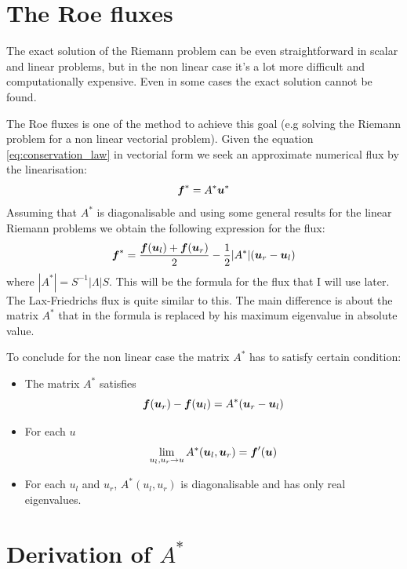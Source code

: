 \documentclass[oneside,12pt]{book}  %
\theoremstyle{plain}
\theoremstyle{definition}
\theoremstyle{remark}
\numberwithin{equation}{chapter} %
\begin{document}
\section{The Roe fluxes}
The exact solution of the Riemann problem can be even straightforward in
scalar and linear problems, but in the non linear case it's a lot more
difficult and computationally expensive. Even in some cases the exact
solution cannot be found.

The Roe fluxes is one of the method to achieve this goal (e.g solving
the Riemann problem for a non linear vectorial problem). 
Given the equation \ref{eq:conservation_law} in vectorial form we seek
an approximate numerical flux by the linearisation:
\begin{equation}
  \label{eq:linearization_roe}
  {\mbox{\boldmath$f$}}^*=A^*{\mbox{\boldmath$u$}}^*
\end{equation}
Assuming that $A^*$ is diagonalisable and using some general results
for the linear Riemann problems we obtain the following expression for
the flux:
\begin{equation}
  \label{eq:roe_flux}
  {\mbox{\boldmath$f$}}^*=\frac{{\mbox{\boldmath$f$}}({\mbox{\boldmath$u$}}_l)+{\mbox{\boldmath$f$}}({\mbox{\boldmath$u$}}_r)}{2} -\frac{1}{2}|A^*|({\mbox{\boldmath$u$}}_r-{\mbox{\boldmath$u$}}_l)
\end{equation}
where $|A^*|=S^{-1}|\Lambda | S$.
This will be the formula for the flux that I will use later.
The Lax-Friedrichs flux is quite similar to this. The main difference
is about the matrix $A^*$ that in the formula is replaced by his
maximum eigenvalue in absolute value.

To conclude for the non linear case the matrix $A^*$ has to satisfy
certain condition:
\begin{itemize}
\item
The matrix $A^*$ satisfies
\begin{equation}
  \label{eq:roe_condition1}
  {\mbox{\boldmath$f$}}({\mbox{\boldmath$u$}}_r)-{\mbox{\boldmath$f$}}({\mbox{\boldmath$u$}}_l)=A^*({\mbox{\boldmath$u$}}_r-{\mbox{\boldmath$u$}}_l)
\end{equation}
\item
For each $u$
\begin{equation}
  \label{eq:roe_condition2}
  \lim_{u_l,u_r \to u}A ^*({\mbox{\boldmath$u$}}_l,{\mbox{\boldmath$u$}}_r)={\mbox{\boldmath$f$}}'({\mbox{\boldmath$u$}})
\end{equation}
\item
For each $u_l$ and $u_r$, $A^*(u_l,u_r)$ is diagonalisable and has
only real eigenvalues.
\end{itemize}

\section{Derivation of $A^*$}
\end{document}
